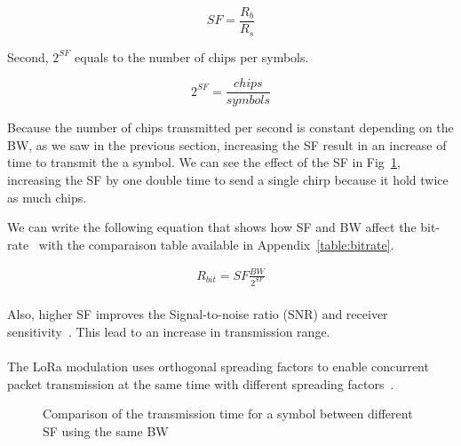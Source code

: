 \begin{equation}
 \label{eq:sf1}
  SF = \frac{R_b}{R_s}
\end{equation}

Second, $2^{SF}$ equals to the number of chips per symbols.

\begin{equation}
 \label{eq:sf2}
  2^{SF} = \frac{chips}{symbols}
\end{equation}

Because the number of chips transmitted per second is constant depending on the BW,
as we saw in the previous section, increasing the SF result in an increase of
time to transmit the a symbol.
We can see the effect of the SF in Fig~\ref{fig:sfcomp},
increasing the SF by one double time to send a single chirp because it hold
twice as much chips.

We can write the following equation that shows how SF and BW affect the
bit-rate~\cite{semtech:modemdesign} with the comparaison table available in
Appendix~\ref{table:bitrate}.

\begin{gather}
 \label{eq:bitrate}
  R_{bit} = SF \frac{BW}{2^{SF}}
\end{gather}


\paragraph{}

Also, higher SF improves the Signal-to-noise ratio
(SNR) and receiver sensitivity~\cite{semtech:modemdesign}.
This lead to an increase in transmission range.

\paragraph{}


The LoRa modulation uses orthogonal spreading factors to enable concurrent
packet transmission at the same time with different
spreading factors~\cite{semtech:modulationbasics}.

\begin{figure}[H]
\centering
{}
\caption{Comparison of the transmission time for a symbol between different SF
  using the same BW\label{fig:sfcomp}}
\end{figure}

